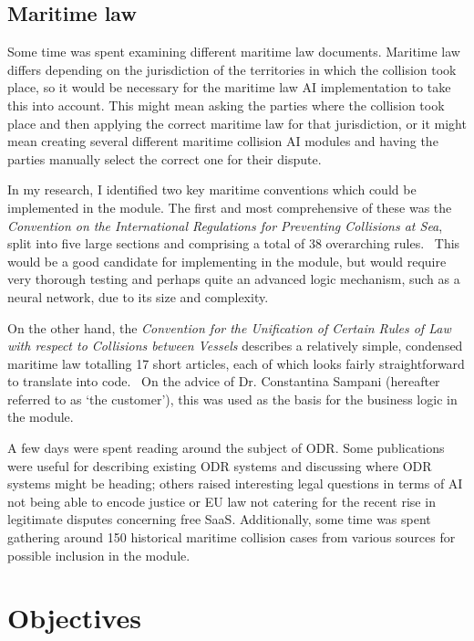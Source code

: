 \subsection{Maritime law}\label{subsection:maritimeLaw}

Some time was spent examining different maritime law documents. Maritime law differs depending on the jurisdiction of the territories in which the collision took place, so it would be necessary for the maritime law AI implementation to take this into account. This might mean asking the parties where the collision took place and then applying the correct maritime law for that jurisdiction, or it might mean creating several different maritime collision AI modules and having the parties manually select the correct one for their dispute.

In my research, I identified two key maritime conventions which could be implemented in the module. The first and most comprehensive of these was the \emph{Convention on the International Regulations for Preventing Collisions at Sea}, split into five large sections and comprising a total of 38 overarching rules.~\cite{law:long} This would be a good candidate for implementing in the module, but would require very thorough testing and perhaps quite an advanced logic mechanism, such as a neural network, due to its size and complexity.

On the other hand, the \emph{Convention for the Unification of Certain Rules of Law with respect to Collisions between Vessels} describes a relatively simple, condensed maritime law totalling 17 short articles, each of which looks fairly straightforward to translate into code.~\cite{law:short} On the advice of Dr. Constantina Sampani (hereafter referred to as `the customer'), this was used as the basis for the business logic in the module.

A few days were spent reading around the subject of ODR. Some publications were useful for describing existing ODR systems \cite{br:cyberMediation} and discussing where ODR systems might be heading; \cite{br:generations}  others raised interesting legal questions in terms of AI not being able to encode justice \cite{br:gameTheory} or EU law not catering for the recent rise in legitimate disputes concerning free SaaS. \cite{br:cloudComputing} Additionally, some time was spent gathering around 150 historical maritime collision cases from various sources for possible inclusion in the module. \cite{cases1}\cite{cases2}\cite{cases3}

\section{Objectives}

